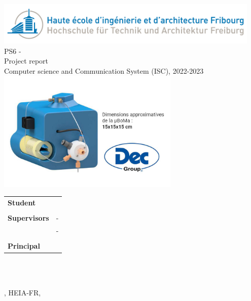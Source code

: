 
\begin{titlepage}
{\selectfont
    \begin{center}
	    \includegraphics[width=0.95\textwidth]{img/heiafr_logo}
		~\\[1.5cm]
		{
			\Huge
			PS6 - \ThesisTitle\\Project report \\[0.5cm]
			\large Computer science and Communication System (ISC), 2022-2023\\[2cm]
		}
		\includegraphics[width=0.65\textwidth]{img/logo.png}
		~\\[2cm]
		{
			\begin{center}
			\begin{tabularx}{\textwidth} { %
				>{\raggedright\arraybackslash}X
				>{\raggedright\arraybackslash}X  }
					 \textbf{Student} & \Author\\
					 & \\
					 \textbf{Supervisors} & \Advisor \space - \AdvisorSchool \\ & \AdvisorTwo \space - \AdvisorTwoSchool \\
					 & \\
					 \textbf{Principal} & \Mendant\\
			\end{tabularx}
			\end{center}
			~\\[1.5cm]
		}

		\vfill



	    {\reportVersion}\\
		{\large \Place, HEIA-FR, \Date}

	\end{center}
}
\restoregeometry
\end{titlepage}





